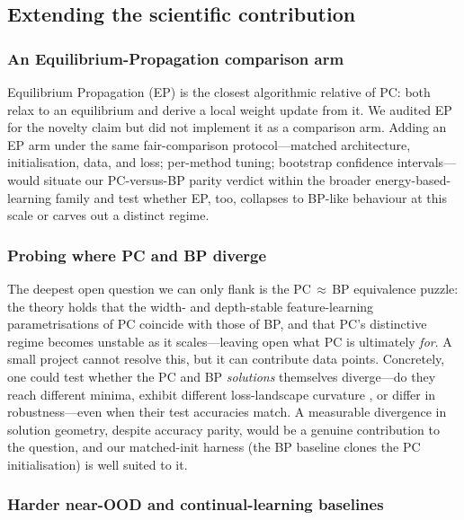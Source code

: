 \subsection{Extending the scientific contribution}

\subsubsection{An Equilibrium-Propagation comparison arm}

Equilibrium Propagation (EP) \citep{scellier2017ep, laborieux2021ep} is the closest
algorithmic relative of PC: both relax to an equilibrium and derive a local weight
update from it. We audited EP for the novelty claim but did not implement it as a
comparison arm. Adding an EP arm under the same fair-comparison protocol---matched
architecture, initialisation, data, and loss; per-method tuning; bootstrap
confidence intervals---would situate our PC-versus-BP parity verdict within the
broader energy-based-learning family and test whether EP, too, collapses to BP-like
behaviour at this scale or carves out a distinct regime.

\subsubsection{Probing where PC and BP diverge}

The deepest open question we can only flank is the PC$\,\approx\,$BP equivalence
puzzle: the theory \citep{innocenti2026limits} holds that the width- and
depth-stable feature-learning parametrisations of PC coincide with those of BP, and
that PC's distinctive regime becomes unstable as it scales---leaving open what PC is
ultimately \emph{for}. A small project cannot resolve this, but it can contribute
data points. Concretely, one could test whether the PC and BP \emph{solutions}
themselves diverge---do they reach different minima, exhibit different loss-landscape
curvature \citep{zahid2023curvature}, or differ in robustness---even when their test
accuracies match. A measurable divergence in solution geometry, despite accuracy
parity, would be a genuine contribution to the question, and our matched-init harness
(the BP baseline clones the PC initialisation) is well suited to it.

\subsubsection{Harder near-OOD and continual-learning baselines}

